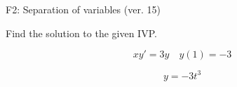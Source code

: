 \begin{exercise}
  \begin{exerciseTitle}F2: Separation of variables (ver. 15)\end{exerciseTitle}
  \begin{exerciseStatement}
    
Find the solution to the given IVP.

    
\[xy'= 3 y \hspace{1em} y( 1 ) = -3\]

  \end{exerciseStatement}
  \begin{exerciseAnswer}
    
\[y= -3 t^ 3\]

  \end{exerciseAnswer}
\end{exercise}